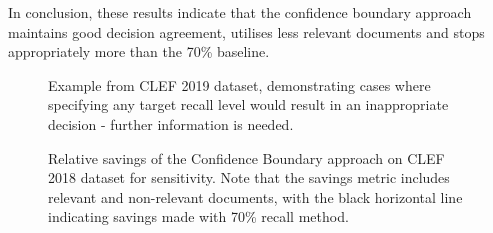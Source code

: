 \documentclass[sigconf,natbib=true,anonymous=true]{acmart}
\begin{document}
In conclusion, these results indicate that the confidence boundary approach maintains good decision agreement, utilises less relevant documents and stops appropriately more  than the 70\% baseline.  
\begin{figure}
    \centering
    
    \caption{Example from CLEF 2019 dataset, demonstrating cases where specifying any target recall level would result in an inappropriate decision - further information is needed.}
    \label{fig:Type B}
\end{figure}



\begin{figure}
    \centering
    
    \caption{Relative savings of the Confidence Boundary approach on CLEF 2018 dataset for sensitivity. Note that the savings metric includes relevant and non-relevant documents, with the black horizontal line indicating savings made with 70\% recall method.}
    \label{fig:savings_analysis_clef_19}
\end{figure}

\end{document}
